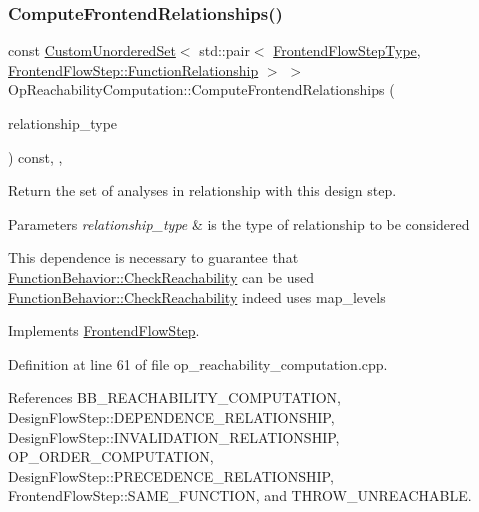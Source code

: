 \subsubsection{\texorpdfstring{Compute\+Frontend\+Relationships()}{ComputeFrontendRelationships()}}
{\footnotesize\ttfamily const \hyperlink{classCustomUnorderedSet}{Custom\+Unordered\+Set}$<$ std\+::pair$<$ \hyperlink{frontend__flow__step_8hpp_afeb3716c693d2b2e4ed3e6d04c3b63bb}{Frontend\+Flow\+Step\+Type}, \hyperlink{classFrontendFlowStep_af7cf30f2023e5b99e637dc2058289ab0}{Frontend\+Flow\+Step\+::\+Function\+Relationship} $>$ $>$ Op\+Reachability\+Computation\+::\+Compute\+Frontend\+Relationships (\begin{DoxyParamCaption}\item[{const \hyperlink{classDesignFlowStep_a723a3baf19ff2ceb77bc13e099d0b1b7}{Design\+Flow\+Step\+::\+Relationship\+Type}}]{relationship\+\_\+type }\end{DoxyParamCaption}) const\hspace{0.3cm}{\ttfamily [override]}, {\ttfamily [private]}, {\ttfamily [virtual]}}



Return the set of analyses in relationship with this design step. 


\begin{DoxyParams}{Parameters}
{\em relationship\+\_\+type} & is the type of relationship to be considered \\
\hline
\end{DoxyParams}
This dependence is necessary to guarantee that \hyperlink{classFunctionBehavior_abac17bd921424216c7f67c0a7d276c6e}{Function\+Behavior\+::\+Check\+Reachability} can be used \hyperlink{classFunctionBehavior_abac17bd921424216c7f67c0a7d276c6e}{Function\+Behavior\+::\+Check\+Reachability} indeed uses map\+\_\+levels 

Implements \hyperlink{classFrontendFlowStep_abeaff70b59734e462d347ed343dd700d}{Frontend\+Flow\+Step}.



Definition at line 61 of file op\+\_\+reachability\+\_\+computation.\+cpp.



References B\+B\+\_\+\+R\+E\+A\+C\+H\+A\+B\+I\+L\+I\+T\+Y\+\_\+\+C\+O\+M\+P\+U\+T\+A\+T\+I\+ON, Design\+Flow\+Step\+::\+D\+E\+P\+E\+N\+D\+E\+N\+C\+E\+\_\+\+R\+E\+L\+A\+T\+I\+O\+N\+S\+H\+IP, Design\+Flow\+Step\+::\+I\+N\+V\+A\+L\+I\+D\+A\+T\+I\+O\+N\+\_\+\+R\+E\+L\+A\+T\+I\+O\+N\+S\+H\+IP, O\+P\+\_\+\+O\+R\+D\+E\+R\+\_\+\+C\+O\+M\+P\+U\+T\+A\+T\+I\+ON, Design\+Flow\+Step\+::\+P\+R\+E\+C\+E\+D\+E\+N\+C\+E\+\_\+\+R\+E\+L\+A\+T\+I\+O\+N\+S\+H\+IP, Frontend\+Flow\+Step\+::\+S\+A\+M\+E\+\_\+\+F\+U\+N\+C\+T\+I\+ON, and T\+H\+R\+O\+W\+\_\+\+U\+N\+R\+E\+A\+C\+H\+A\+B\+LE.

